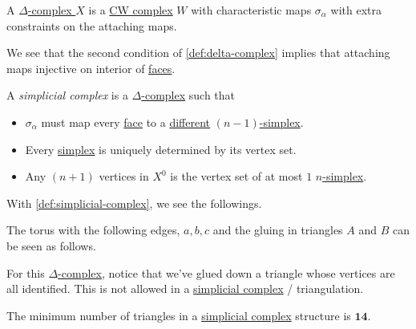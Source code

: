 \begin{exercise}
	A \hyperref[def:delta-complex]{\(\Delta\)-complex } \(X\) is a \hyperref[def:CW-Complex]{CW complex} \(W\) with characteristic maps \(\sigma _\alpha \)
	with extra constraints on the attaching maps.
\end{exercise}
\begin{note}
	We see that the second condition of \autoref{def:delta-complex} implies that attaching maps injective on interior of \hyperref[def:face]{faces}.
\end{note}

\begin{definition}\label{def:simplicial-complex}
	A \emph{simplicial complex} is a \hyperref[def:delta-complex]{\(\Delta \)-complex} such that
	\begin{itemize}
		\item \(\sigma _\alpha \) must map every \hyperref[def:face]{face} to a \underline{different} \hyperref[def:standard-simplex]{\((n-1)\)-simplex}.
		\item Every \hyperref[def:standard-simplex]{simplex} is uniquely determined by its vertex set.
		\item Any \((n+1)\) vertices in \(X^0\) is the vertex set of at most \(1\) \hyperref[def:standard-simplex]{\(n\)-simplex}.
	\end{itemize}
\end{definition}
\begin{remark}
	With \autoref{def:simplicial-complex}, we see the followings.
	\begin{figure}[H]
		\centering
		\label{fig:rmk:simplicial-complex}
	\end{figure}
\end{remark}

\begin{eg}
	The torus with the following edges, \(a, b, c\) and the gluing in triangles \(A\) and \(B\) can be seen as follows.
	\begin{figure}[H]
		\centering
		\label{fig:eg:constructing-torus-simplicial}
	\end{figure}
	For this \hyperref[def:delta-complex]{\(\Delta \)-complex}, notice that we've glued down a triangle whose vertices are all
	identified. This is not allowed in a \hyperref[def:simplicial-complex]{simplicial complex} / triangulation.

	\begin{remark}
		The minimum number of triangles in a \hyperref[def:simplicial-complex]{simplicial complex} structure is \(\bm{14}\).
	\end{remark}
\end{eg}